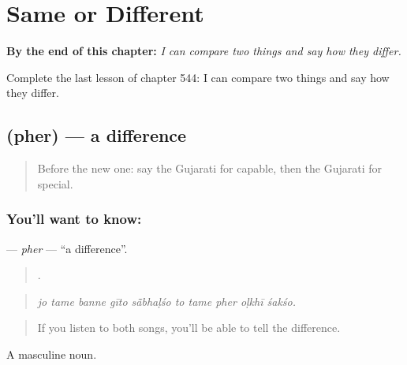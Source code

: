 
\chapter{Same or Different}
\label{ch:gu-same-or-different}

\begin{chapteropening}
\textbf{By the end of this chapter:} \emph{I can compare two things and say how they differ.}

Complete the last lesson of chapter 544: I can compare two things and say how they differ.
\end{chapteropening}

\section[\texorpdfstring{\gu{ફેર} (pher)}{ફેર (pher)}]{ (pher) — a difference}

\label{lesson:GU-C544-pher}



\begin{quote}
Before the new one: say the Gujarati for capable, then the Gujarati for special.
\end{quote}

\subsection*{You'll want to know: }
\textbf{} — \emph{pher} — \textquotedblleft{}a difference\textquotedblright{}.

\begin{quote}
         .
\end{quote}

\begin{quote}
\emph{jo tame banne gīto sā̃bhaḷśo to tame pher oḷkhī śakśo.}
\end{quote}

\begin{quote}
If you listen to both songs, you'll be able to tell the difference.
\end{quote}

A masculine noun.

